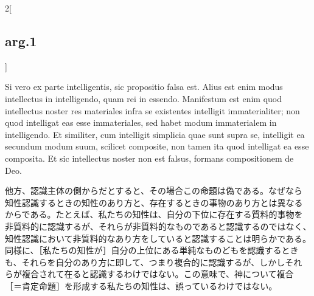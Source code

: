 \documentclass[paper=a4paper,fontsize=10pt,jafontsize=9pt,titlepage]{jlreq}
\begin{document}
\begin{paracol}{2}[\subsection{arg.1}]
\switchcolumn*

Si vero ex parte intelligentis, sic propositio falsa est. Alius est
enim modus intellectus in intelligendo, quam rei in
essendo. Manifestum est enim quod intellectus noster res materiales
infra se existentes intelligit immaterialiter; non quod intelligat eas
esse immateriales, sed habet modum immaterialem in intelligendo. Et
similiter, cum intelligit simplicia quae sunt supra se, intelligit ea
secundum modum suum, scilicet composite, non tamen ita quod intelligat
ea esse composita. Et sic intellectus noster non est falsus, formans
compositionem de Deo.

\switchcolumn

他方、認識主体の側からだとすると、その場合この命題は偽である。なぜなら
知性認識するときの知性のあり方と、存在するときの事物のあり方とは異なる
からである。たとえば、私たちの知性は、自分の下位に存在する質料的事物を
非質料的に認識するが、それらが非質料的なものであると認識するのではなく、
知性認識において非質料的なあり方をしていると認識することは明らかである。
同様に、［私たちの知性が］自分の上位にある単純なものどもを認識するとき
も、それらを自分のあり方に即して、つまり複合的に認識するが、しかしそれ
らが複合されて在ると認識するわけではない。この意味で、神について複合
［＝肯定命題］を形成する私たちの知性は、誤っているわけではない。

\end{paracol}
\end{document}

